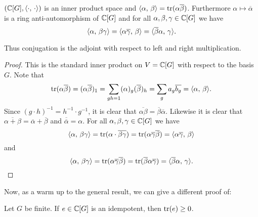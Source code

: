 \begin{lemma}
    $(\mathbb{C}[G], \langle \cdot, \, \cdot \rangle)$ is an inner product space and $\langle \alpha, \, \beta \rangle = \operatorname{tr}(\alpha \overline{\beta})$.
    Furthermore $\alpha \mapsto \overline{\alpha}$ is a ring anti-automorphism of $\mathbb{C}[G]$ and for all $\alpha, \beta, \gamma \in \mathbb{C}[G]$ we have \[
        \langle \alpha, \, \beta \gamma \rangle = \langle \alpha \overline{\gamma}, \, \beta \rangle = \langle \overline{\beta}\alpha, \, \gamma \rangle.
    \]
\end{lemma}

Thus conjugation is the adjoint with respect to left and right multiplication.

\begin{proof}
    This is the standard inner product on $V = \mathbb{C}[G]$ with respect to the basis $G$.
    Note that \[
        \operatorname{tr}(\alpha \overline{\beta}) = (\alpha \overline{\beta})_1 = \sum_{gh = 1}(\alpha)_g (\overline{\beta})_h = \sum_g a_g \overline{b_g} = \langle \alpha, \, \beta \rangle.
    \]
    Since $(g \cdot h)^{-1} = h^{-1} \cdot g^{-1}$, it is clear that $\overline{\alpha \beta} = \overline{\beta} \overline{\alpha}$.
    Likewise it is clear that $\overline{\alpha + \beta} = \overline{\alpha} + \overline{\beta}$ and $\overline{\overline{\alpha}} = \alpha$.
    For all $\alpha, \beta, \gamma \in \mathbb{C}[G]$ we have \[
        \langle \alpha, \, \beta \gamma \rangle = \operatorname{tr}(\alpha \cdot \overline{\beta \gamma}) = \operatorname{tr}(\alpha \overline{\gamma} \overline{\beta}) = \langle \alpha \overline{\gamma}, \, \beta \rangle
    \] and \[
        \langle \alpha, \, \beta \gamma \rangle = \operatorname{tr}(\alpha \overline{\gamma} \overline{\beta}) = \operatorname{tr}(\overline{\beta} \alpha \overline{\gamma}) = \langle \overline{\beta} \alpha, \, \gamma \rangle.
    \]
\end{proof}

Now, as a warm up to the general result, we can give a different proof of:
\begin{lemma}
    Let $G$ be finite.
    If $e \in \mathbb{C}[G]$ is an idempotent, then $\operatorname{tr}(e) \geq 0$.
\end{lemma}


